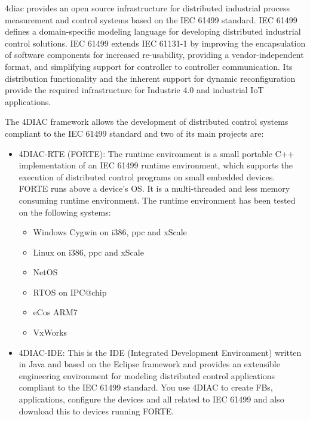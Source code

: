 
\let\svus\_
\newcommand\newuson{\def\_{\svus\allowbreak\hspace{0pt}}}
\newcommand\newusoff{\let\_\svus}
\newuson

4diac provides an open source infrastructure for distributed industrial process measurement and control systems based on the IEC 61499 standard. IEC 61499 defines a domain-specific
modeling language for developing distributed industrial control solutions. IEC 61499 extends IEC 61131-1 by improving the encapsulation of software components for increased re-usability, 
providing a vendor-independent format, and simplifying support for controller to controller communication. Its distribution functionality and the inherent support for dynamic reconfiguration 
provide the required infrastructure for Industrie 4.0 and industrial IoT applications.

The 4DIAC framework allows the development of distributed control systems compliant to the IEC 61499 standard and two of its main projects are:

\begin{itemize}
  \item 4DIAC-RTE (FORTE): The runtime environment is a small portable C++ implementation of an IEC 61499 runtime environment, which supports the execution of distributed control programs 
  on small embedded devices. FORTE runs above a device's OS. It is a multi-threaded and less memory consuming runtime environment. The runtime environment has been tested on the following systems:
  \begin{itemize}
    \item Windows Cygwin on i386, ppc and xScale
    \item Linux on i386, ppc and xScale
    \item NetOS
    \item RTOS on IPC@chip
    \item eCos ARM7
    \item VxWorks
  \end{itemize}     
  \item 4DIAC-IDE: This is the IDE (Integrated Development Environment) written in Java and based on the Eclipse framework and provides an extensible engineering environment for modeling 
  distributed control applications compliant to the IEC 61499 standard. You use 4DIAC to create FBs, applications, configure the devices and all related to IEC 61499 and also download this 
  to devices running FORTE.
\end{itemize}

